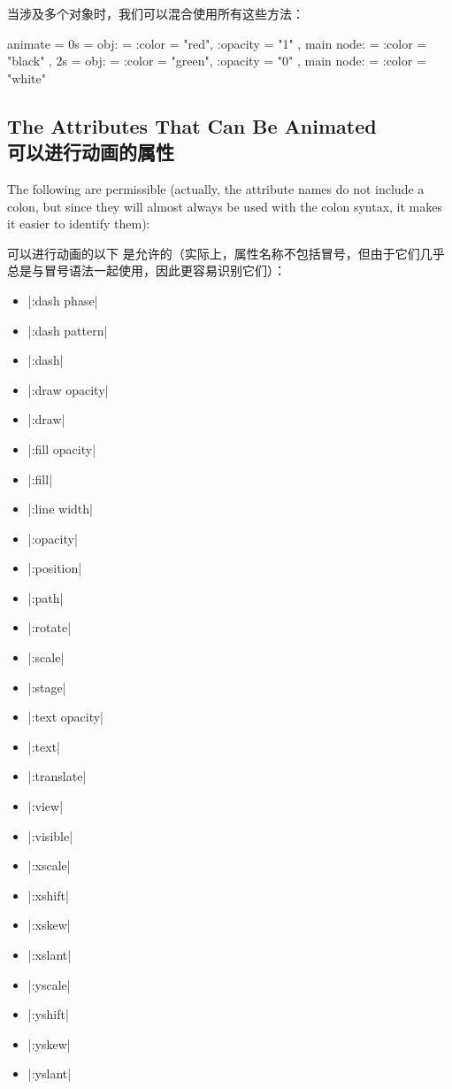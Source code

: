 \begin{enumerate}
        当涉及多个对象时，我们可以混合使用所有这些方法：

\begin{codeexample}
animate = {
  0s = {
    obj: = {
      :color = "red",
      :opacity = "1"
    },
    main node: = {
      :color = "black"
    }
  },
  2s = {
    obj: = {
      :color = "green",
      :opacity = "0"
    },
    main node: = {
      :color = "white"
    }
  }
}
\end{codeexample}
\end{enumerate}


\subsection{The Attributes That Can Be Animated\\可以进行动画的属性}
\label{section-anim-attrs}

The following  are permissible (actually, the attribute names
do not include a colon, but since they will almost always be used with the
colon syntax, it makes it easier to identify them):

可以进行动画的以下  是允许的（实际上，属性名称不包括冒号，但由于它们几乎总是与冒号语法一起使用，因此更容易识别它们）：


\begin{itemize}
        \itemsep0pt
    \item |:dash phase|
    \item |:dash pattern|
    \item |:dash|
    \item |:draw opacity|
    \item |:draw|
    \item |:fill opacity|
    \item |:fill|
    \item |:line width|
    \item |:opacity|
    \item |:position|
    \item |:path|
    \item |:rotate|
    \item |:scale|
    \item |:stage|
    \item |:text opacity|
    \item |:text|
    \item |:translate|
    \item |:view|
    \item |:visible|
    \item |:xscale|
    \item |:xshift|
    \item |:xskew|
    \item |:xslant|
    \item |:yscale|
    \item |:yshift|
    \item |:yskew|
    \item |:yslant|
\end{itemize}

